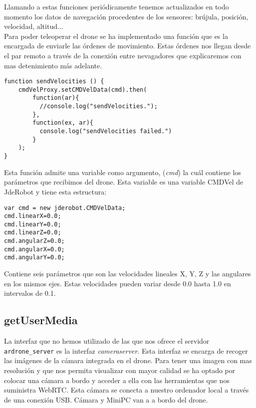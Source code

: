 Llamando a estas funciones periódicamente tenemos actualizados en todo momento los datos de navegación procedentes de los sensores: brújula, posición, velocidad, altitud...\\

Para poder teleoperar el drone se ha implementado una función que es la encargada de enviarle las órdenes de movimiento. Estas órdenes nos llegan desde el par remoto a través de la conexión entre nevagadores que explicaremos con mas detenimiento más adelante.\\

\begin{lstlisting}[caption=Función manejadora de las órdenes.]
function sendVelocities () {
    cmdVelProxy.setCMDVelData(cmd).then(
        function(ar){
          //console.log("sendVelocities.");
        },
        function(ex, ar){
          console.log("sendVelocities failed.")
        }
    );
}
\end{lstlisting}

Esta función admite una variable como argumento, (\emph{cmd}) la cuál contiene los parámetros que recibimos del drone. Esta variable es una variable CMDVel de JdeRobot y tiene esta estructura:\\

\begin{lstlisting}[caption=Variable CMD]
var cmd = new jderobot.CMDVelData; 
cmd.linearX=0.0;
cmd.linearY=0.0;
cmd.linearZ=0.0;
cmd.angularZ=0.0;
cmd.angularX=0.0;
cmd.angularY=0.0;
\end{lstlisting}

Contiene seis parámetros que son las velocidades lineales X, Y, Z y las angulares en los mismos ejes. Estas velocidades pueden variar desde 0.0 hasta 1.0 en intervalos de 0.1.\\


\subsection{getUserMedia}

La interfaz que no hemos utilizado de las que nos ofrece el servidor \texttt{ardrone\_server} es la interfaz \emph{cameraserver}. Esta interfaz se encarga de recoger las imágenes de la cámara integrada en el drone. Para tener una imagen con mas resolución y que nos permita visualizar con mayor calidad se ha optado por colocar una cámara a bordo y acceder a ella con las herramientas que nos suministra WebRTC. Esta cámara se conecta a nuestro ordenador local a través de una conexión USB. Cámara y MiniPC van a a bordo del drone.\\

